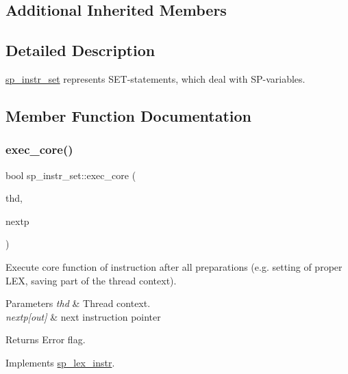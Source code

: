 \subsection*{Additional Inherited Members}


\subsection{Detailed Description}
\mbox{\hyperlink{classsp__instr__set}{sp\+\_\+instr\+\_\+set}} represents S\+ET-\/statements, which deal with SP-\/variables. 

\subsection{Member Function Documentation}
\mbox{\label{classsp__instr__set_adc6287f3c6cce44e717167cec46a0149}} 
\subsubsection{\texorpdfstring{exec\+\_\+core()}{exec\_core()}}
{\footnotesize\ttfamily bool sp\+\_\+instr\+\_\+set\+::exec\+\_\+core (\begin{DoxyParamCaption}\item[{T\+HD $\ast$}]{thd,  }\item[{uint $\ast$}]{nextp }\end{DoxyParamCaption})\hspace{0.3cm}{\ttfamily [virtual]}}

Execute core function of instruction after all preparations (e.\+g. setting of proper L\+EX, saving part of the thread context).


\begin{DoxyParams}{Parameters}
{\em thd} & Thread context. \\
\hline
{\em nextp\mbox{[}out\mbox{]}} & next instruction pointer\\
\hline
\end{DoxyParams}
\begin{DoxyReturn}{Returns}
Error flag. 
\end{DoxyReturn}


Implements \mbox{\hyperlink{classsp__lex__instr_acab4e56f638f43101c11f838e1f9d395}{sp\+\_\+lex\+\_\+instr}}.

